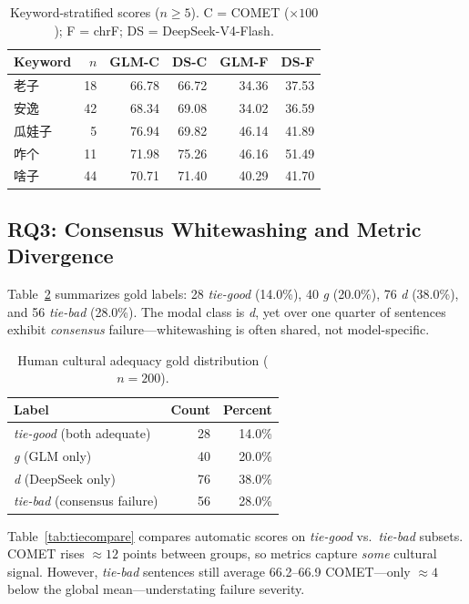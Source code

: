 \documentclass[11pt]{article}
\begin{document}
\begin{table}[t]
  \centering
  \small
  \begin{tabular}{@{}lrrrrr@{}}
    \toprule
    \textbf{Keyword} & \textbf{$n$} & \textbf{GLM-C} & \textbf{DS-C} & \textbf{GLM-F} & \textbf{DS-F} \\
    \midrule
    老子 & 18 & 66.78 & 66.72 & 34.36 & 37.53 \\
    安逸 & 42 & 68.34 & 69.08 & 34.02 & 36.59 \\
    瓜娃子 & 5 & 76.94 & 69.82 & 46.14 & 41.89 \\
    咋个 & 11 & 71.98 & 75.26 & 46.16 & 51.49 \\
    啥子 & 44 & 70.71 & 71.40 & 40.29 & 41.70 \\
    \bottomrule
  \end{tabular}
  \caption{Keyword-stratified scores ($n\geq 5$). C = COMET ($\times 100$); F = chrF; DS = DeepSeek-V4-Flash.}
  \label{tab:keywords}
\end{table}

\subsection{RQ3: Consensus Whitewashing and Metric Divergence}

Table~\ref{tab:gold} summarizes gold labels: 28 \emph{tie-good} (14.0\%), 40 \emph{g} (20.0\%), 76 \emph{d} (38.0\%), and 56 \emph{tie-bad} (28.0\%).
The modal class is \emph{d}, yet over one quarter of sentences exhibit \emph{consensus} failure---whitewashing is often shared, not model-specific.

\begin{table}[t]
  \centering
  \small
  \begin{tabular}{@{}lrr@{}}
    \toprule
    \textbf{Label} & \textbf{Count} & \textbf{Percent} \\
    \midrule
    \emph{tie-good} (both adequate) & 28 & 14.0\% \\
    \emph{g} (GLM only) & 40 & 20.0\% \\
    \emph{d} (DeepSeek only) & 76 & 38.0\% \\
    \emph{tie-bad} (consensus failure) & 56 & 28.0\% \\
    \bottomrule
  \end{tabular}
  \caption{Human cultural adequacy gold distribution ($n=200$).}
  \label{tab:gold}
\end{table}

Table~\ref{tab:tiecompare} compares automatic scores on \emph{tie-good} vs.\ \emph{tie-bad} subsets.
COMET rises ${\approx}12$ points between groups, so metrics capture \emph{some} cultural signal.
However, \emph{tie-bad} sentences still average 66.2--66.9 COMET---only ${\approx}4$ below the global mean---understating failure severity.
\end{document}
